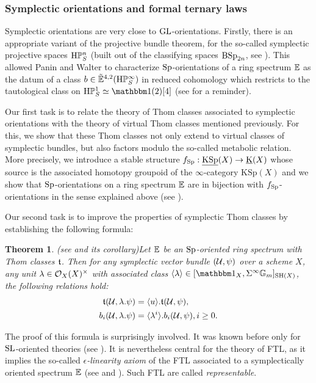 \documentclass[11pt,leqno]{amsart}
\newtheorem{thmi}{Theorem}
\theoremstyle{remark}
\theoremstyle{definition}
\numberwithin{equation}{thm}
\begin{document}
\subsubsection*{Symplectic orientations and formal ternary laws}

Symplectic orientations are very close to $\mathrm{GL}$-orientations.
 Firstly, there is an appropriate variant of the projective bundle theorem,
 for the so-called symplectic projective spaces $\mathrm{H}\mathbb P^n_S$
 (built out of the classifying spaces $\mathrm{BSp}_{2n}$, see ).
 This allowed Panin and Walter to characterize $\mathrm{Sp}$-orientations of a ring spectrum $\mathbb E$
 as the datum of a class $b \in \tilde {\mathbb E}^{4,2}(\mathrm{H}\mathbb P^\infty_S)$ in reduced cohomology
 which restricts to the tautological class on $\HP^1_S\simeq \un(2)[4]$
 (see  for a reminder).

Our first task is to relate the theory of Thom classes
 associated to symplectic orientations with the theory of virtual Thom classes
 mentioned previously.
 For this, we show that these Thom classes not only extend to 
 virtual classes of symplectic bundles, but also factors modulo the so-called metabolic relation.
 More precisely, we introduce a stable structure
 $f_{\mathrm{Sp}}:\operatorname{\underline{KSp}}(X) \rightarrow \operatorname{\underline K}(X)$ whose source is the associated homotopy groupoid of the $\infty$-category $\mathrm{KSp}(X)$ and we show that $\mathrm{Sp}$-orientations
 on a ring spectrum $\mathbb E$ are in bijection with $f_{\mathrm{Sp}}$-orientations in the
 sense explained above (see ).

Our second task is to improve the properties of symplectic Thom classes
 by establishing the following formula:
\begin{thmi}(see  and its corollary)\label{thmi:epsilon}
Let $\mathbb E$ be an $\mathrm{Sp}$-oriented ring spectrum with Thom classes $\mathfrak{t}$.
 Then for any symplectic vector bundle $(\mathcal U,\psi)$ over a scheme $X$,
 any unit $\lambda \in \mathcal O_X(X)^\times$ with associated class
 $\langle \lambda \rangle \in [\un_X,\Sigma^\infty \GG]_{\SH(X)}$,
 the following relations hold:
\begin{align*}
\mathfrak{t}(\mathcal U,\lambda.\psi)&=\langle u \rangle.\mathfrak{t}(\mathcal U,\psi), \\
b_i(\mathcal U,\lambda.\psi)&=\langle \lambda^i \rangle.b_i(\mathcal U,\psi), i \geq 0.
\end{align*}
\end{thmi}
The proof of this formula is surprisingly involved. It was known before only
 for $\mathrm{SL}$-oriented theories (see \cite[Prop. 2.2.8]{DF3}).
 It is nevertheless central for the theory of FTL,
 as it implies the so-called \emph{$\epsilon$-linearity axiom} of the FTL
 associated to a symplectically oriented spectrum $\mathbb E$
 (see  and ).
 Such FTL are called \emph{representable}.
\end{document}

